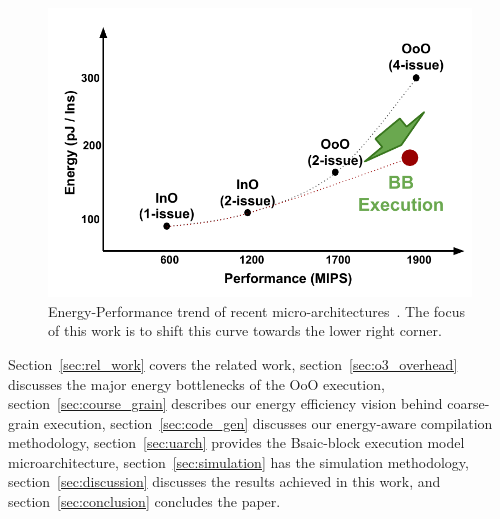 \begin{figure}[t]
	\centering
	\includegraphics[width=1.0\columnwidth]{fig/energy_perf_insight.pdf} 
    \caption{Energy-Performance trend of recent
        micro-architectures~\cite{azizi2010energy}. The focus of this work is to
            shift this curve towards the lower right corner.}
	\label{fig:insight}
\end{figure}

Section~\ref{sec:rel_work} covers the related work,
    section~\ref{sec:o3_overhead} discusses the major energy bottlenecks of the
    OoO execution, section~\ref{sec:course_grain} describes our energy
    efficiency vision behind coarse-grain execution, section~\ref{sec:code_gen}
    discusses our energy-aware compilation methodology, section~\ref{sec:uarch}
    provides the Bsaic-block execution model microarchitecture,
    section~\ref{sec:simulation} has the simulation methodology,
    section~\ref{sec:discussion} discusses the results achieved in this work,
    and section~\ref{sec:conclusion} concludes the paper.
